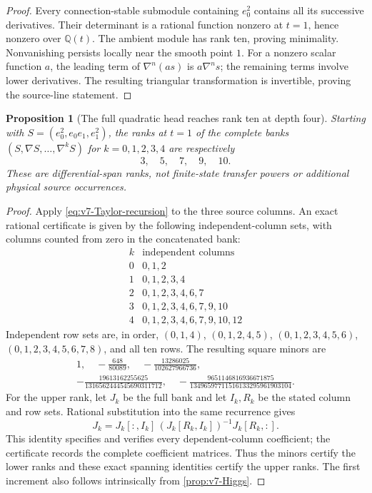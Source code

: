 \documentclass[11pt]{article}
\newtheorem{proposition}[proposition]{Proposition}
\theoremstyle{definition}
\theoremstyle{remark}
\newcommand{\Q}{\mathbb Q}
\begin{document}
\begin{proof}
Every connection-stable submodule containing $e_0^2$ contains all its
successive derivatives. Their determinant is a rational function nonzero at
$t=1$, hence nonzero over $\Q(t)$. The ambient module has rank ten, proving
minimality. Nonvanishing persists locally near the smooth point $1$.
For a nonzero scalar function $a$, the leading term of $\nabla^n(as)$ is
$a\nabla^n s$; the remaining terms involve lower derivatives. The resulting
triangular transformation is invertible, proving the source-line statement.
\end{proof}

\begin{proposition}[The full quadratic head reaches rank ten at depth four]
\label{prop:v7-joint-ranks}
Starting with $S=(e_0^2,e_0e_1,e_1^2)$, the ranks at $t=1$ of the complete
banks $(S,\nabla S,\ldots,\nabla^kS)$ for $k=0,1,2,3,4$ are respectively
\begin{equation}
 \boxed{3,\quad5,\quad7,\quad9,\quad10.}
 \label{eq:v7-joint-ranks}
\end{equation}
These are differential-span ranks, not finite-state transfer powers or
additional physical source occurrences.
\end{proposition}
\begin{proof}
Apply \eqref{eq:v7-Taylor-recursion} to the three source columns. An exact
rational certificate is given by the following independent-column sets, with
columns counted from zero in the concatenated bank:
\[
\begin{array}{c|l}
k&\text{independent columns}\\\hline
0&0,1,2\\
1&0,1,2,3,4\\
2&0,1,2,3,4,6,7\\
3&0,1,2,3,4,6,7,9,10\\
4&0,1,2,3,4,6,7,9,10,12
\end{array}
\]
Independent row sets are, in order,
$(0,1,4)$, $(0,1,2,4,5)$, $(0,1,2,3,4,5,6)$,
$(0,1,2,3,4,5,6,7,8)$, and all ten rows. The resulting square minors are
\[
\begin{gathered}
 1,\quad -\frac{648}{80089},\quad
 -\frac{13286025}{102627966736},\\[0.4em]
 -\frac{19613162255625}{1316562444545690311712},\quad
 -\frac{9651146816936671875}{13496597711516133295961903104}.
\end{gathered}
\]
For the upper rank, let $J_k$ be the full bank and let $I_k,R_k$ be the stated
column and row sets. Rational substitution into the same recurrence gives
\[
 J_k=J_k[:,I_k]\,
          (J_k[R_k,I_k])^{-1}J_k[R_k,:].
\]
This identity specifies and verifies every dependent-column coefficient; the
certificate records the complete coefficient matrices. Thus the minors certify
the lower ranks and these exact spanning identities certify the upper ranks.
The first increment also follows intrinsically from
\cref{prop:v7-Higgs}.
\end{proof}
\end{document}
